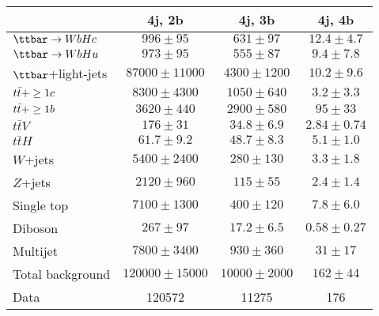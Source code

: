 \begin{table}[htbp]
\small
\begin{center}
\begin{tabular}{l*{3}{c}}
\hline\hline
 & 4j, 2b & 4j, 3b & 4j, 4b \\
\hline
$\Hc$ & $ 996 \pm 95 $ &   $ 631 \pm 97 $ &   $ 12.4 \pm 4.7 $ \\ 
$\Hu$ & $ 973 \pm 95 $ &   $ 555 \pm 87 $ &   $ 9.4 \pm 7.8 $ \\
\hline
$\ttbar$+light-jets & $ 87000 \pm 11000 $ &   $ 4300 \pm 1200 $ &   $ 10.2 \pm 9.6 $ \\ 
$t\bar{t}+\geq1c$ & $ 8300 \pm 4300 $ &   $ 1050 \pm 640 $ &   $ 3.2 \pm 3.3 $ \\ 
$t\bar{t}+\geq1b$ & $ 3620 \pm 440 $ &   $ 2900 \pm 580 $ &   $ 95 \pm 33 $ \\ 
$t\bar{t}V$ & $ 176 \pm 31 $ &   $ 34.8 \pm 6.9 $ &   $ 2.84 \pm 0.74 $ \\ 
$t\bar{t}H$ & $ 61.7 \pm 9.2 $ &   $ 48.7 \pm 8.3 $ &   $ 5.1 \pm 1.0 $ \\
$W$+jets & $ 5400 \pm 2400 $ &   $ 280 \pm 130 $ &   $ 3.3 \pm 1.8 $ \\ 
$Z$+jets & $ 2120 \pm 960 $ &   $ 115 \pm 55 $ &   $ 2.4 \pm 1.4 $ \\ 
Single top & $ 7100 \pm 1300 $ &   $ 400 \pm 120 $ &   $ 7.8 \pm 6.0 $ \\ 
Diboson & $ 267 \pm 97 $ &   $ 17.2 \pm 6.5 $ &   $ 0.58 \pm 0.27 $ \\ 
Multijet & $ 7800 \pm 3400 $ &   $ 930 \pm 360 $ &   $ 31 \pm 17 $ \\
\hline
Total background & $ 120000 \pm 15000 $ &   $ 10000 \pm 2000 $ &   $ 162 \pm 44 $ \\ 
\hline
Data & 120572  & 11275  & 176  \\
\hline\hline    
\end{tabular}
\vspace{0.2cm}


\end{center}
\end{table}
